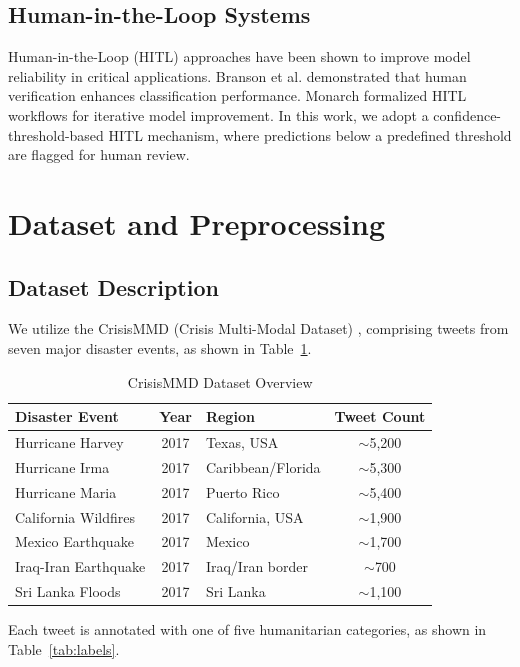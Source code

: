 \documentclass[pdflatex,sn-mathphys-num]{sn-jnl}%
\theoremstyle{thmstyleone}%
\theoremstyle{thmstyletwo}%
\theoremstyle{thmstylethree}%
\begin{document}
\subsection{Human-in-the-Loop Systems}

Human-in-the-Loop (HITL) approaches have been shown to improve model reliability in critical applications. Branson et al. \cite{ref14} demonstrated that human verification enhances classification performance. Monarch \cite{ref15} formalized HITL workflows for iterative model improvement. In this work, we adopt a confidence-threshold-based HITL mechanism, where predictions below a predefined threshold are flagged for human review.

\section{Dataset and Preprocessing}

\subsection{Dataset Description}

We utilize the CrisisMMD (Crisis Multi-Modal Dataset) \cite{ref5}, comprising tweets from seven major disaster events, as shown in Table~\ref{tab:dataset}.

\begin{table}[h]
\centering
\caption{CrisisMMD Dataset Overview}
\label{tab:dataset}
\begin{tabular}{|l|c|l|c|}
\hline
\textbf{Disaster Event} & \textbf{Year} & \textbf{Region} & \textbf{Tweet Count} \\
\hline
Hurricane Harvey & 2017 & Texas, USA & $\sim$5,200 \\
Hurricane Irma & 2017 & Caribbean/Florida & $\sim$5,300 \\
Hurricane Maria & 2017 & Puerto Rico & $\sim$5,400 \\
California Wildfires & 2017 & California, USA & $\sim$1,900 \\
Mexico Earthquake & 2017 & Mexico & $\sim$1,700 \\
Iraq-Iran Earthquake & 2017 & Iraq/Iran border & $\sim$700 \\
Sri Lanka Floods & 2017 & Sri Lanka & $\sim$1,100 \\
\hline
\end{tabular}
\end{table}

Each tweet is annotated with one of five humanitarian categories, as shown in Table~\ref{tab:labels}.
\end{document}

